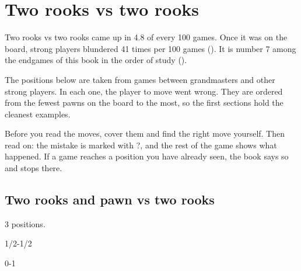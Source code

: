 \chapter{Two rooks vs two rooks}\label{ch:two-rooks-vs-two-rooks}
Two rooks vs two rooks came up in 4.8 of every 100 games. Once it was on the board, strong players blundered 41 times per 100 games (). It is number 7 among the endgames of this book in the order of study ().

The positions below are taken from games between grandmasters and other strong players. In each one, the player to move went wrong. They are ordered from the fewest pawns on the board to the most, so the first sections hold the cleanest examples.

Before you read the moves, cover them and find the right move yourself. Then read on: the mistake is marked with ?, and the rest of the game shows what happened. If a game reaches a position you have already seen, the book says so and stops there.


\section{Two rooks and pawn vs two rooks}
3 positions.


1/2-1/2\par
{}

0-1\par
{}

